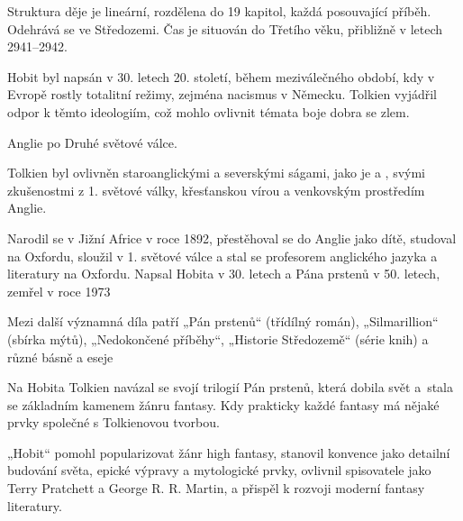 \documentclass{extarticle} %
\begin{document}
\noindent Struktura děje je lineární, rozdělena do 19 kapitol, každá posouvající příběh.
Odehrává se ve Středozemi.
Čas je situován do Třetího věku, přibližně v letech 2941–2942.



\noindent Hobit byl napsán v 30. letech 20. století,
během meziválečného období, kdy v Evropě rostly totalitní režimy, zejména nacismus v Německu.
Tolkien vyjádřil odpor k těmto ideologiím, což mohlo ovlivnit témata boje dobra se zlem.

\noindent Anglie po Druhé světové válce.


\noindent Tolkien byl ovlivněn staroanglickými a severskými ságami,
jako je  a ,
svými zkušenostmi z 1. světové války,
křesťanskou vírou a venkovským prostředím Anglie.

\noindent Narodil se v Jižní Africe v roce 1892,
přestěhoval se do Anglie jako dítě, studoval na Oxfordu,
sloužil v 1. světové válce a stal se profesorem anglického jazyka a literatury na Oxfordu.
Napsal Hobita v 30. letech a Pána prstenů v 50. letech, zemřel v roce 1973


\noindent 
Mezi další významná díla patří „Pán prstenů“ (třídílný román), „Silmarillion“ (sbírka mýtů),
„Nedokončené příběhy“, „Historie Středozemě“ (série knih) a různé básně a eseje

\noindent Na Hobita Tolkien navázal se svojí trilogií Pán prstenů, která dobila svět
a~stala se základním kamenem žánru fantasy.
Kdy prakticky každé fantasy má nějaké prvky společné s Tolkienovou tvorbou.

„Hobit“ pomohl popularizovat žánr high fantasy,
stanovil konvence jako detailní budování světa, epické výpravy a mytologické prvky,
ovlivnil spisovatele jako Terry Pratchett a George R. R. Martin,
a přispěl k rozvoji moderní fantasy literatury.

\end{document}
